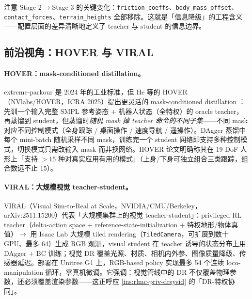 注意 Stage 2$\to$Stage 3 的关键变化：\verb|friction_coeffs|、\verb|body_mass_offset|、\verb|contact_forces|、\verb|terrain_heights| 全部移除。这就是「信息降级」的工程含义——配置层面的差异清晰地定义了 teacher 与 student 的信息边界。

\subsection{前沿视角：HOVER 与 VIRAL}
\label{sec:rlmc-priv-frontier}

\paragraph{HOVER：mask-conditioned distillation。} extreme-parkour 是 2024 年的工业标准，但 He 等的 HOVER（NVlabs/HOVER，ICRA 2025）提出更灵活的 mask-conditioned distillation \cite{he2025hover}：先训一个输入完整 SMPL 参考姿态 + 机器人状态（全特权）的 oracle teacher，再蒸馏到 student，但蒸馏时\emph{随机 mask 掉 teacher 命令的不同子集}——不同 mask 对应不同控制模式（全身跟踪 / 桌面操作 / 速度导航 / 遥操作）。DAgger 蒸馏中每个 mini-batch 随机采样不同 mask，训练完一个 student 网络即支持多种控制模式，切换模式只需改输入 mask 而非换网络。HOVER 论文明确称其在 19-DoF 人形上「支持 $>15$ 种对真实应用有用的模式」（上身/下身可独立组合三类跟踪，组合数远不止 15）。

\paragraph{VIRAL：大规模视觉 teacher-student。} VIRAL（Visual Sim-to-Real at Scale，NVIDIA/CMU/Berkeley，arXiv:2511.15200）代表「大规模集群上的视觉 teacher-student」\cite{he2025viral}：privileged RL teacher（delta-action space + reference-state-initialization + 特权地形/物体真值）$\to$ 用 Isaac Lab 大规模 tiled rendering（\verb|TiledCamera|，可扩展到数十 GPU、最多 64）生成 RGB 观测，visual student 在 teacher 诱导的状态分布上用 DAgger + BC 训练；视觉 DR 覆盖光照、材质、相机内外参、图像质量降级、传感器延迟。部署在 Unitree G1 上，RGB-based policy 实现最多 54 个连续 loco-manipulation 循环，零真机微调。它强调：视觉管线中的 DR 不仅覆盖物理参数，还必须覆盖渲染参数——这正呼应 \cref{ins:rlmc-priv-drsysid} 的「DR-特权协同」。

